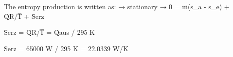 The entropy production is written as:  
→ stationary → 0 = ṁ(s_a - s_e) + Q̇R/T̅ + Ṡerz  

Ṡerz = Q̇R/T̅ = Q̇aus / 295 K  

Ṡerz = 65000 W / 295 K = 22.0339 W/K